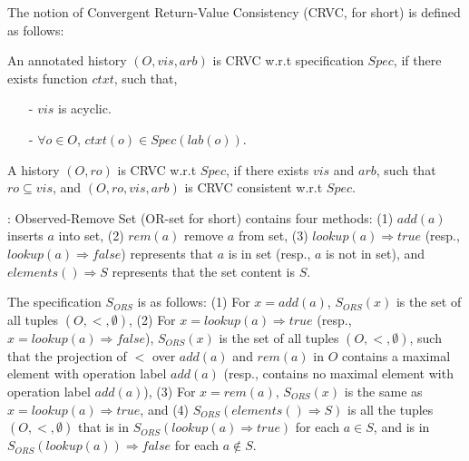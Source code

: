 The notion of Convergent Return-Value Consistency (CRVC, for short) is defined as follows: 

\begin{definition}
\label{definition:strong return value consistency}
An annotated history $(O,\mathit{vis},\mathit{arb})$ is CRVC w.r.t specification $Spec$, if there exists function $ctxt$, such that,

\begin{itemize}
\setlength{\itemsep}{0.5pt}
\item[-] $\mathit{vis}$ is acyclic.

\item[-] $\forall o \in O$, $ctxt(o) \in Spec(lab(o))$.
\end{itemize}

A history $(O,\mathit{ro})$ is CRVC w.r.t $Spec$, if there exists $\mathit{vis}$ and $\mathit{arb}$, such that $\mathit{ro} \subseteq \mathit{vis}$, and $(O,\mathit{ro},\mathit{vis},\mathit{arb})$ is CRVC consistent w.r.t $Spec$. 
\end{definition}

: Observed-Remove Set (OR-set for short) \cite{Shapiro:2011,Bieniusa:2012} contains four methods: (1) $add(a)$ inserts $a$ into set, (2) $rem(a)$ remove $a$ from set, (3) $lookup(a)\Rightarrow \mathit{true}$ (resp., $lookup(a)\Rightarrow \mathit{false}$) represents that $a$ is in set (resp., $a$ is not in set), and $elements() \Rightarrow S$ represents that the set content is $S$.


The specification $S_{\mathit{ORS}}$ is as follows: (1) For $x=add(a)$, $S_{\mathit{ORS}}(x)$ is the set of all tuples $(O,<,\emptyset)$, (2) For $x=lookup(a) \Rightarrow \mathit{true}$ (resp., $x=lookup(a) \Rightarrow \mathit{false}$), $S_{\mathit{ORS}}(x)$ is the set of all tuples $(O,<,\emptyset)$, such that the projection of $<$ over $add(a)$ and $rem(a)$ in $O$ contains a maximal element with operation label $add(a)$ (resp., contains no maximal element with operation label $add(a)$), (3) For $x = rem(a)$, $S_{\mathit{ORS}}(x)$ is the same as $x = lookup(a) \Rightarrow \mathit{true}$, and (4) $S_{\mathit{ORS}}(elements() \Rightarrow S)$ is all the tuples $(O,<,\emptyset)$ that is in $S_{\mathit{ORS}}(lookup(a) \Rightarrow \mathit{true})$ for each $a \in S$, and is in $S_{\mathit{ORS}}(lookup(a)) \Rightarrow \mathit{false}$ for each $a \notin S$. 

